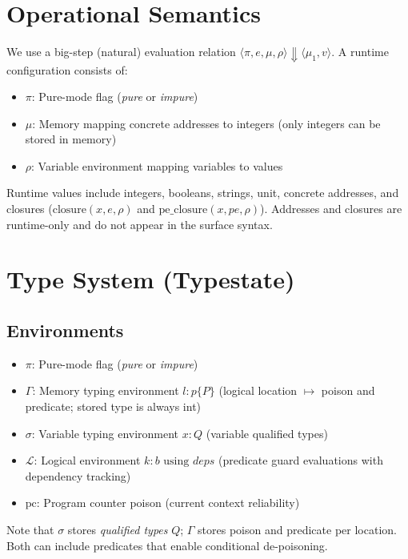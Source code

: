 \documentclass[12pt]{article}
\begin{document}
\section{Operational Semantics}

We use a big-step (natural) evaluation relation
$\langle \pi, e, \mu, \rho \rangle \Downarrow \langle \mu_1, v \rangle$.
A runtime configuration consists of:
\begin{itemize}
    \item $\pi$: Pure-mode flag (\textit{pure} or \textit{impure})
    \item $\mu$: Memory mapping concrete addresses to integers (only integers can be stored in memory)
    \item $\rho$: Variable environment mapping variables to values
\end{itemize}

Runtime values include integers, booleans, strings, unit, concrete addresses, and
closures ($\text{closure}(x, e, \rho)$ and $\text{pe\_closure}(x, pe, \rho)$).
Addresses and closures are runtime-only and do not appear in the surface syntax.



\section{Type System (Typestate)}

\subsection{Environments}

\begin{itemize}
    \item $\pi$: Pure-mode flag (\textit{pure} or \textit{impure})
    \item $\Gamma$: Memory typing environment $l : p \{ P \}$ (logical location $\mapsto$ poison and predicate; stored type is always int)
    \item $\sigma$: Variable typing environment $x : Q$ (variable qualified types)
    \item $\mathcal{L}$: Logical environment $k : b \text{ using } deps$ (predicate guard evaluations with dependency tracking)
    \item $\text{pc}$: Program counter poison (current context reliability)
\end{itemize}

Note that $\sigma$ stores \emph{qualified types} $Q$; $\Gamma$ stores poison and
predicate per location. Both can include predicates that enable conditional
de-poisoning.
\end{document}
